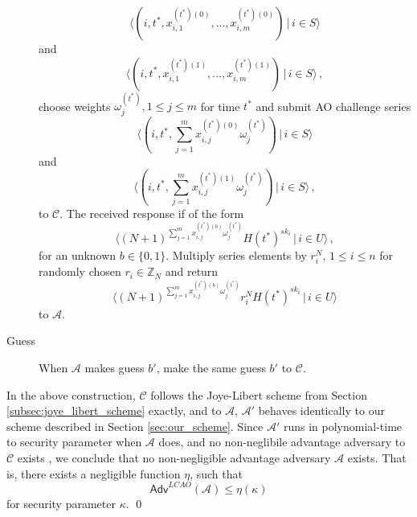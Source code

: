 \documentclass[twocolumn]{autart}
\theoremstyle{definition}
\theoremstyle{remark}
\begin{document}
\begin{pf}
\begin{description}
\begin{equation*}
            \langle(i,t^*,x^{(t^*)(0)}_{i,1},\dots,x^{(t^*)(0)}_{i,m})\,|\,i \in S\rangle
        \end{equation*}
        and
        \begin{equation*}
            \langle(i,t^*,x^{(t^*)(1)}_{i,1},\dots,x^{(t^*)(1)}_{i,m})\,|\, i \in S\rangle\,,
        \end{equation*}
        choose weights $\omega^{(t^*)}_j,1 \leq j \leq m$ for time $t^*$ and submit AO challenge series
        \begin{equation*}
            \langle(i,t^*,\sum^m_{j=1}x^{(t^*)(0)}_{i,j}\omega^{(t^*)}_j)\,|\,i \in S\rangle
        \end{equation*}
        and
        \begin{equation*}
            \langle(i,t^*,\sum^m_{j=1}x^{(t^*)(1)}_{i,j}\omega^{(t^*)}_j)\,|\,i \in S\rangle\,,
        \end{equation*}
        to $\mathcal{C}$. The received response if of the form 
        \begin{equation*}
            \langle(N+1)^{\sum^m_{j=1}x^{(t^*)(b)}_{i,j}\omega^{(t^*)}_j}H(t^*)^{sk_i}\,|\,i\in U\rangle\,,
        \end{equation*}
        for an unknown $b \in \{0,1\}$. Multiply series elements by $r_i^N,\,1 \leq i \leq n$ for randomly chosen $r_i \in \mathbb{Z}_N$ and return
        \begin{equation*}
            \langle(N+1)^{\sum^m_{j=1}x^{(t^*)(b)}_{i,j}\omega^{(t^*)}_j}r_i^N H(t^*)^{sk_i}\,|\,i\in U\rangle
        \end{equation*}
        to $\mathcal{A}$.
        \item[Guess] When $\mathcal{A}$ makes guess $b'$, make the same guess $b'$ to $\mathcal{C}$.
    \end{description}

    In the above construction, $\mathcal{C}$ follows the Joye-Libert scheme from Section \ref{subsec:joye_libert_scheme} exactly, and to $\mathcal{A}$, $\mathcal{A}'$ behaves identically to our scheme described in Section \ref{sec:our_scheme}. Since $\mathcal{A}'$ runs in polynomial-time to security parameter when $\mathcal{A}$ does, and no non-neglibile advantage adversary to $\mathcal{C}$ exists \cite{joyeScalableSchemePrivacyPreserving2013}, we conclude that no non-negligible advantage adversary $\mathcal{A}$ exists. That is, there exists a negligible function $\eta$, such that
    \begin{equation*}
        \mathsf{Adv}^{LCAO}(\mathcal{A}) \leq \eta(\kappa)
    \end{equation*}
    for security parameter $\kappa$. \qed
\end{pf}
\end{document}
